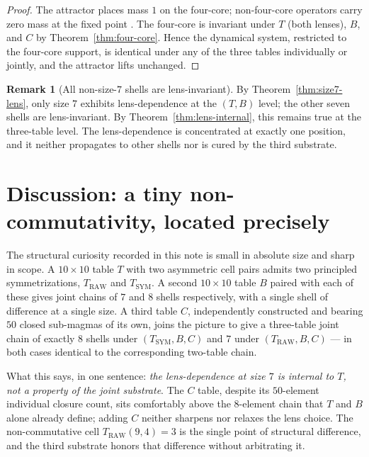 \documentclass[11pt,reqno]{amsart}
\theoremstyle{definition}
\newtheorem{remark}[theorem]{Remark}
\newcommand{\TRAW}{T_{\mathrm{RAW}}}
\newcommand{\TSYM}{T_{\mathrm{SYM}}}
\begin{document}
\begin{proof}
The attractor places mass $1$ on the four-core; non-four-core
operators carry zero mass at the fixed point
\cite{Sanders2026Attractor}. The four-core is invariant under
$T$ (both lenses), $B$, and $C$ by Theorem~\ref{thm:four-core}.
Hence the dynamical system, restricted to the four-core support,
is identical under any of the three tables individually or
jointly, and the attractor lifts unchanged.
\end{proof}

\begin{remark}[All non-size-$7$ shells are lens-invariant]
\label{rem:other-shells}
By Theorem~\ref{thm:size7-lens}, only size $7$ exhibits
lens-dependence at the $(T,B)$ level; the other seven shells
are lens-invariant. By Theorem~\ref{thm:lens-internal}, this
remains true at the three-table level. The lens-dependence is
concentrated at exactly one position, and it neither propagates
to other shells nor is cured by the third substrate.
\end{remark}

\section{Discussion: a tiny non-commutativity, located precisely}
\label{sec:discussion}

The structural curiosity recorded in this note is small in
absolute size and sharp in scope. A $10\times 10$ table $T$ with
two asymmetric cell pairs admits two principled symmetrizations,
$\TRAW$ and $\TSYM$. A second $10\times 10$ table $B$ paired
with each of these gives joint chains of $7$ and $8$ shells
respectively, with a single shell of difference at a single size.
A third table $C$, independently constructed and bearing $50$
closed sub-magmas of its own, joins the picture to give a
three-table joint chain of exactly $8$ shells under
$(\TSYM, B, C)$ and $7$ under $(\TRAW, B, C)$ — in both cases
identical to the corresponding two-table chain.

What this says, in one sentence: \emph{the lens-dependence at
size $7$ is internal to $T$, not a property of the joint
substrate}. The $C$ table, despite its $50$-element individual
closure count, sits comfortably above the $8$-element chain that
$T$ and $B$ alone already define; adding $C$ neither sharpens
nor relaxes the lens choice. The non-commutative cell
$\TRAW(9,4)=3$ is the single point of structural difference, and
the third substrate honors that difference without arbitrating
it.
\end{document}
